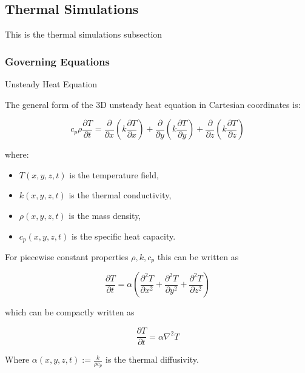 \subsection{Thermal Simulations}

This is the thermal simulations subsection

\subsubsection{Governing Equations}
Unsteady Heat Equation

The general form of the 3D unsteady heat equation in Cartesian coordinates is:

\begin{equation}
    c_p \rho \frac{\partial T}{\partial t} = 
    \frac{\partial}{\partial x} \left( k \frac{\partial T}{\partial x} \right) + 
    \frac{\partial}{\partial y} \left( k \frac{\partial T}{\partial y} \right) + 
    \frac{\partial}{\partial z} \left( k \frac{\partial T}{\partial z} \right)
\end{equation}


where:
\begin{itemize}
    \item \( T(x,y,z,t) \) is the temperature field,
    \item \( k(x,y,z,t) \) is the thermal conductivity,
    \item \( \rho(x,y,z,t) \) is the mass density,
    \item \( c_p (x,y,z,t) \) is the specific heat capacity.
    
\end{itemize}

For piecewise constant properties $\rho, k, c_p$ this can be written as

\begin{equation}
    \frac{\partial T}{\partial t} = \alpha \left( \frac{\partial^2 T}{\partial x^2} + \frac{\partial^2 T}{\partial y^2} + \frac{\partial^2 T}{\partial z^2} \right)
\end{equation}

which can be compactly written as

\begin{equation}
    \frac{\partial T}{\partial t} = \alpha \nabla^2 T
\end{equation}



Where \( \alpha(x,y,z,t) := \frac{k}{\rho c_p}\) is the thermal diffusivity.

